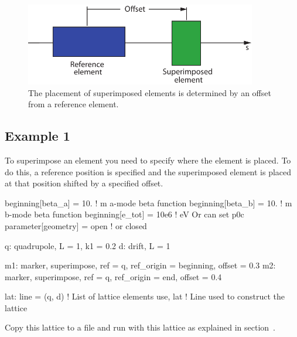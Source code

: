\documentclass{hitec}
\begin{document}
\begin{figure}[tb]
  \centering
  \includegraphics[width=0.9\textwidth]{superimpose.pdf}
  \caption{The placement of superimposed elements is determined by an offset from a reference element.}
  \label{f:superimpose}
\end{figure}

\subsection{Example 1}

To superimpose an element you need to specify where the element is placed. To do this, a reference position is specified
and the superimposed element is placed at that position shifted by a specified offset.

{\small
\begin{code}
beginning[beta_a] = 10.   ! m  a-mode beta function
beginning[beta_b] = 10.   ! m  b-mode beta function
beginning[e_tot] = 10e6   ! eV   Or can set p0c
parameter[geometry] = open      ! or closed

q: quadrupole, L = 1, k1 = 0.2
d: drift, L = 1

m1: marker, superimpose, ref = q, ref_origin = beginning, offset = 0.3
m2: marker, superimpose, ref = q, ref_origin = end, offset = 0.4

lat: line = (q, d)   ! List of lattice elements
use, lat             ! Line used to construct the lattice
\end{code}}

Copy this lattice to a file and run \tao with this lattice as explained in
section~. 
\end{document}
